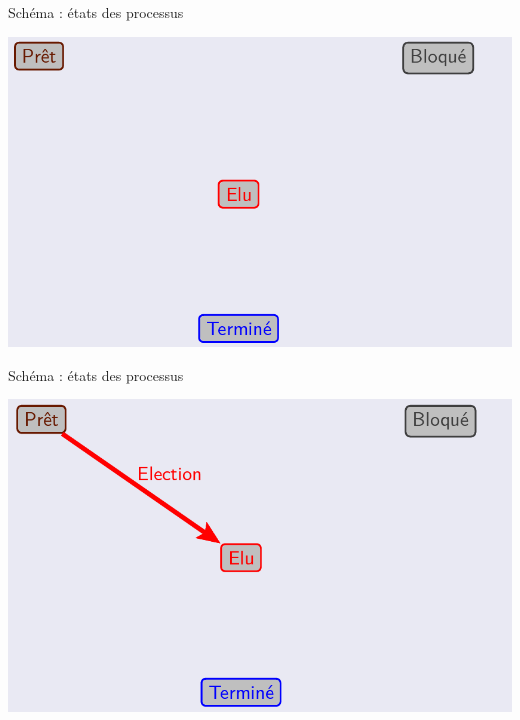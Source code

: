 \documentclass[10pt]{beamer}
\begin{document}
\begin{frame}
	\mframe{\Processus}
	\begin{block}{Schéma : états des processus}
		\begin{center}
\includegraphics[scale=0.25]{../../Archi_Materielle/data/etats_processus_1}
	\end{center}
	\end{block}
\end{frame}

\begin{frame}
	\mframe{\Processus}
	\begin{block}{Schéma : états des processus}
			\begin{center}
		\includegraphics[scale=0.25]{../../Archi_Materielle/data/etats_processus_2}
			\end{center}
	\end{block}
\end{frame}
\end{document}
